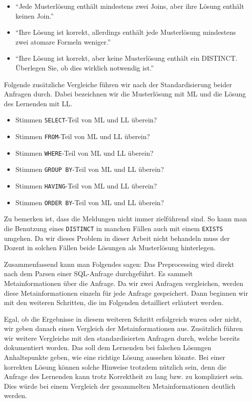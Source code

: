 \begin{itemize}
\item ``Jede Musterlösung enthält mindestens zwei Joins, aber ihre Lösung enthält keinen Join.''
\item ``Ihre Lösung ist korrekt, allerdings enthält jede Musterlösung mindestens zwei atomare Formeln weniger.''
\item ``Ihre Lösung ist korrekt, aber keine Musterlösung enthält ein DISTINCT. Überlegen Sie, ob dies wirklich notwendig ist.'' 
\end{itemize}

Folgende zusätzliche Vergleiche führen wir nach der Standardisierung beider Anfragen durch. Dabei bezeichnen wir die Musterlösung mit ML und die Lösung des Lernenden mit LL.

\begin{itemize}
\item Stimmen \verb|SELECT|-Teil von ML und LL überein?
\item Stimmen \verb|FROM|-Teil von ML und LL überein?
\item Stimmen \verb|WHERE|-Teil von ML und LL überein?
\item Stimmen \verb|GROUP BY|-Teil von ML und LL überein?
\item Stimmen \verb|HAVING|-Teil von ML und LL überein?
\item Stimmen \verb|ORDER BY|-Teil von ML und LL überein?
\end{itemize}

Zu bemerken ist, dass die Meldungen nicht immer zielführend sind. So kann man die Benutzung eines \verb|DISTINCT| in manchen Fällen auch mit einem \verb|EXISTS| umgehen. Da wir dieses Problem in dieser Arbeit nicht behandeln muss der Dozent in solchen Fällen beide Lösungen als Musterlösung hinterlegen.

Zusammenfassend kann man Folgendes sagen: Das Preprocessing wird direkt nach dem Parsen einer SQL-Anfrage durchgeführt. Es sammelt Metainformationen über die Anfrage. Da wir zwei Anfragen vergleichen, werden diese Metainformationen einzeln für jede Anfrage gespeichert. Dann beginnen wir mit den weiteren Schritten, die im Folgenden detailliert erläutert werden.

Egal, ob die Ergebnisse in diesem weiteren Schritt erfolgreich waren oder nicht, wir geben danach einen Vergleich der Metainformationen aus. Zusätzlich führen wir weitere Vergleiche mit den standardisierten Anfragen durch, welche bereits dokumentiert worden. Das soll dem Lernenden bei falschen Lösungen Anhaltspunkte geben, wie eine richtige Lösung aussehen könnte. Bei einer korrekten Lösung können solche Hinweise trotzdem nützlich sein, denn die Anfrage des Lernenden kann trotz Korrektheit zu lang bzw. zu kompliziert sein. Dies würde bei einem Vergleich der gesammelten Metainformationen deutlich werden.

